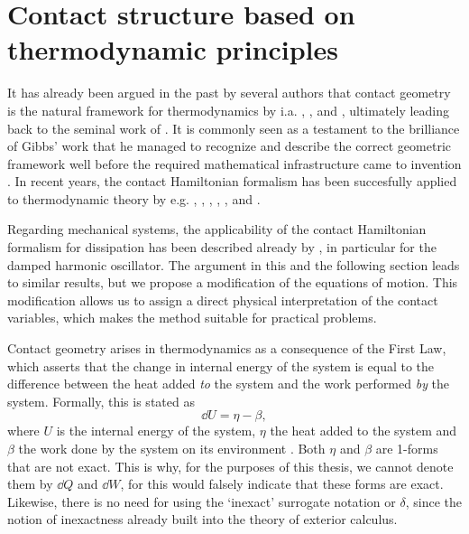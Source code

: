 \section{Contact structure based on thermodynamic principles}
\label{sec:thermodynamics}
It has already been argued in the past by several authors that contact geometry is the natural framework for thermodynamics by i.a. \citet{Arnold1991,Arnold1989a,Arnold1989,Arnold1989b}, \citet{Bamberg1988}, \citet{Burke1985} and \citet{Hermann1973}, ultimately leading back to the seminal work of \citet{Gibbs1873}. It is commonly seen as a testament to the brilliance of Gibbs' work that he managed to recognize and describe the correct geometric framework well before the required mathematical infrastructure came to invention \cite{Wightman1979}. In recent years, the contact Hamiltonian formalism has been succesfully applied to thermodynamic theory by e.g. \citet{Mrugala1991,Mrugala2000,Mrugala1984,Mrugala1985,Mrugala1993,Mrugala1996}, \citet{Balian2001}, \citet{VanderSchaft2021a,VanderSchaft2018}, \citet{Maschke2018}, \citet{Bravetti2015}, and \citet{Simoes2020}. 

Regarding mechanical systems, the applicability of the contact Hamiltonian formalism for dissipation has been described already by \citet{Bravetti2017}, in particular for the damped harmonic oscillator. The argument in this and the following section leads to similar results, but we propose a modification of the equations of motion. This modification allows us to assign a direct physical interpretation of the contact variables, which makes the method suitable for practical problems.

Contact geometry arises in thermodynamics as a consequence of the First Law, which asserts that the change in internal energy of the system is equal to the difference between the heat added \emph{to} the system and the work performed \emph{by} the system. Formally, this is stated as
\begin{equation}
    \dd{U} = \eta - \beta,
    \label{eq:thermo_first_law}
\end{equation}
where $U$ is the internal energy of the system, $\eta$ the heat added to the system and $\beta$ the work done by the system on its environment \cite{Bamberg1988,Frankel2012}. Both $\eta$ and $\beta$ are 1-forms that are not exact. This is why, for the purposes of this thesis, we cannot denote them by $\dd{Q}$ and  $\dd{W}$, for this would falsely indicate that these forms are exact. Likewise, there is no need for using the `inexact' surrogate notation \dj\xspace or $\delta$, since the notion of inexactness already built into the theory of exterior calculus. 

